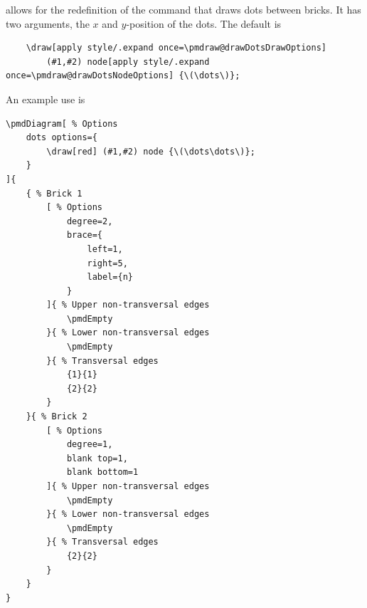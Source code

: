 \documentclass{ltxdoc}
\begin{document}
allows for the redefinition of the command that draws dots between bricks. It has two arguments, the \( x \) and \( y \)-position of the dots. The default is
\begin{verbatim}
    \draw[apply style/.expand once=\pmdraw@drawDotsDrawOptions]
        (#1,#2) node[apply style/.expand once=\pmdraw@drawDotsNodeOptions] {\(\dots\)};
\end{verbatim}
An example use is
\begin{center}
    \begin{minipage}{\dimexpr0.85\textwidth-2\fboxrule-2\fboxsep\relax}
        \begin{minipage}[c]{0.4\linewidth}
\begin{verbatim}
\pmdDiagram[ % Options
    dots options={
        \draw[red] (#1,#2) node {\(\dots\dots\)};
    }
]{
    { % Brick 1
        [ % Options
            degree=2,
            brace={
                left=1,
                right=5,
                label={n}
            }
        ]{ % Upper non-transversal edges
            \pmdEmpty
        }{ % Lower non-transversal edges
            \pmdEmpty
        }{ % Transversal edges
            {1}{1}
            {2}{2}
        }
    }{ % Brick 2
        [ % Options
            degree=1,
            blank top=1,
            blank bottom=1
        ]{ % Upper non-transversal edges
            \pmdEmpty
        }{ % Lower non-transversal edges
            \pmdEmpty
        }{ % Transversal edges
            {2}{2}
        }
    }
}
\end{verbatim}
        \end{minipage}
        \hfill
        \begin{minipage}[c]{0.4\linewidth}
        \end{minipage}
    \end{minipage}%
\end{center}
\begin{center}
\end{center}
\end{document}
